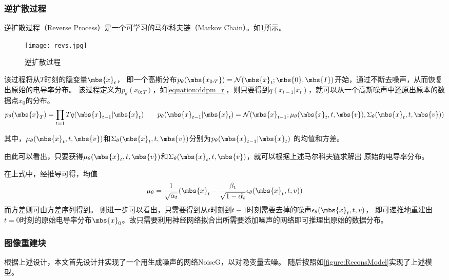 \subsubsection{逆扩散过程}

逆扩散过程（Reverse Process）是一个可学习的马尔科夫链（Markov Chain）。如\cref{figure:revs}所示。

\begin{figure}[h]
    \centering
    \texttt{[image: revs.jpg]}
    \caption{逆扩散过程}
    \label{figure:revs}
\end{figure}

该过程将从$T$时刻的隐变量$\mbs{x}_{t}$，
即一个高斯分布$p_\theta(\mbs{x_{0:T}}) = \mathcal{N}(\mbs{x}_{t}; \mbs{0},\mbs{I})$开始，通过不断去噪声，从而恢复出原始的电导率分布。
该过程定义为$p_\theta(x_{0:T})$，如\cref{equation:ddpm_r}，则只要得到$q(x_{t-1}|x_t)$，就可以从一个高斯噪声中还原出原本的数据点$x_0$的分布。
\begin{equation}
    \centering
    p_\theta(\mbs{x}_{T}) = \prod_{t=1}{T} q(\mbs{x}_{t-1}|\mbs{x}_{t}) \qquad
    p_\theta(\mbs{x}_{t-1}|\mbs{x}_{t}) = \mathcal{N}(\mbs{x}_{t-1}; \mu_\theta(\mbs{x}_{t}, t, \mbs{v}), \Sigma_\theta(\mbs{x}_{t}, t, \mbs{v}))
    \label{equation:ddpm_r}
\end{equation}

其中，$\mu_\theta(\mbs{x}_{t}, t, \mbs{v})$和$\Sigma_\theta(\mbs{x}_{t}, t, \mbs{v})$分别为$p_\theta(\mbs{x}_{t-1}|\mbs{x}_{t})$
的均值和方差。

由此可以看出，只要获得$\mu_\theta(\mbs{x}_{t}, t, \mbs{v})$和$\Sigma_\theta(\mbs{x}_{t}, t, \mbs{v})$，就可以根据上述马尔科夫链求解出
原始的电导率分布。

在上式中，经推导可得，均值
\begin{equation}
  \mu_\theta = \frac{1}{\sqrt{\alpha_t}}(\mbs{x}_{t} - \frac{\beta_t}{\sqrt{1-\hat{\alpha_t}}}\epsilon_\theta(\mbs{x}_{t}, t, v))  
\end{equation}
而方差则可由方差序列得到。
则进一步可以看出，只需要得到从$t$时刻到$t-1$时刻需要去掉的噪声$\epsilon_\theta(\mbs{x}_{t}, t, v)$，
即可递推地重建出$t=0$时刻的原始电导率分布$\mbs{x}_0$。故只需要利用神经网络拟合出所需要添加噪声的网络即可推理出原始的数据分布。

\subsubsection{图像重建块}

根据上述设计，本文首先设计并实现了一个用生成噪声的网络NoiseG，以对隐变量去噪。
随后按照如\cref{figure:ReconsModel}实现了上述模型。


